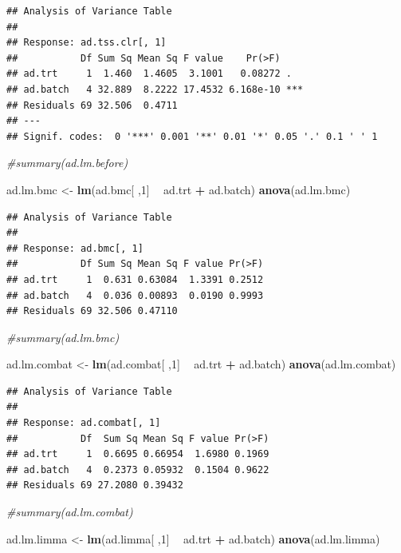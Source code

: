 \documentclass[]{book}
\newenvironment{Shaded}{\begin{snugshade}}{\end{snugshade}}
\newcommand{\KeywordTok}[1]{\textcolor[rgb]{0.13,0.29,0.53}{\textbf{#1}}}
\newcommand{\DecValTok}[1]{\textcolor[rgb]{0.00,0.00,0.81}{#1}}
\newcommand{\StringTok}[1]{\textcolor[rgb]{0.31,0.60,0.02}{#1}}
\newcommand{\CommentTok}[1]{\textcolor[rgb]{0.56,0.35,0.01}{\textit{#1}}}
\newcommand{\OperatorTok}[1]{\textcolor[rgb]{0.81,0.36,0.00}{\textbf{#1}}}
\newcommand{\NormalTok}[1]{#1}
\begin{document}
\begin{verbatim}
## Analysis of Variance Table
## 
## Response: ad.tss.clr[, 1]
##           Df Sum Sq Mean Sq F value    Pr(>F)    
## ad.trt     1  1.460  1.4605  3.1001   0.08272 .  
## ad.batch   4 32.889  8.2222 17.4532 6.168e-10 ***
## Residuals 69 32.506  0.4711                      
## ---
## Signif. codes:  0 '***' 0.001 '**' 0.01 '*' 0.05 '.' 0.1 ' ' 1
\end{verbatim}

\begin{Shaded}
\begin{Highlighting}[]
\CommentTok{#summary(ad.lm.before)}

\NormalTok{ad.lm.bmc <-}\StringTok{ }\KeywordTok{lm}\NormalTok{(ad.bmc[ ,}\DecValTok{1}\NormalTok{] }\OperatorTok{~}\StringTok{ }\NormalTok{ad.trt }\OperatorTok{+}\StringTok{ }\NormalTok{ad.batch)}
\KeywordTok{anova}\NormalTok{(ad.lm.bmc)}
\end{Highlighting}
\end{Shaded}

\begin{verbatim}
## Analysis of Variance Table
## 
## Response: ad.bmc[, 1]
##           Df Sum Sq Mean Sq F value Pr(>F)
## ad.trt     1  0.631 0.63084  1.3391 0.2512
## ad.batch   4  0.036 0.00893  0.0190 0.9993
## Residuals 69 32.506 0.47110
\end{verbatim}

\begin{Shaded}
\begin{Highlighting}[]
\CommentTok{#summary(ad.lm.bmc)}

\NormalTok{ad.lm.combat <-}\StringTok{ }\KeywordTok{lm}\NormalTok{(ad.combat[ ,}\DecValTok{1}\NormalTok{] }\OperatorTok{~}\StringTok{ }\NormalTok{ad.trt }\OperatorTok{+}\StringTok{ }\NormalTok{ad.batch)}
\KeywordTok{anova}\NormalTok{(ad.lm.combat)}
\end{Highlighting}
\end{Shaded}

\begin{verbatim}
## Analysis of Variance Table
## 
## Response: ad.combat[, 1]
##           Df  Sum Sq Mean Sq F value Pr(>F)
## ad.trt     1  0.6695 0.66954  1.6980 0.1969
## ad.batch   4  0.2373 0.05932  0.1504 0.9622
## Residuals 69 27.2080 0.39432
\end{verbatim}

\begin{Shaded}
\begin{Highlighting}[]
\CommentTok{#summary(ad.lm.combat)}

\NormalTok{ad.lm.limma <-}\StringTok{ }\KeywordTok{lm}\NormalTok{(ad.limma[ ,}\DecValTok{1}\NormalTok{] }\OperatorTok{~}\StringTok{ }\NormalTok{ad.trt }\OperatorTok{+}\StringTok{ }\NormalTok{ad.batch)}
\KeywordTok{anova}\NormalTok{(ad.lm.limma)}
\end{Highlighting}
\end{Shaded}
\end{document}
